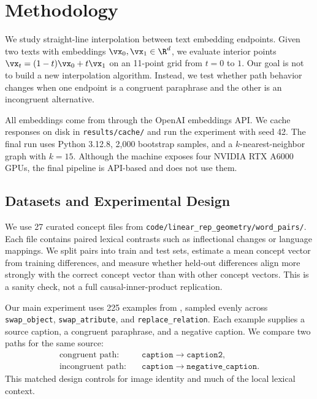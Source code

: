 \section{Methodology}
\label{sec:method}

 We study straight-line interpolation between text embedding endpoints. Given two texts with embeddings $\vx_0, \vx_1 \in \R^d$, we evaluate interior points $\vx_t=(1-t)\vx_0+t\vx_1$ on an 11-point grid from $t=0$ to $1$. Our goal is not to build a new interpolation algorithm. Instead, we test whether path behavior changes when one endpoint is a congruent paraphrase and the other is an incongruent alternative.

 All embeddings come from \embmodel through the OpenAI embeddings API. We cache responses on disk in \texttt{results/cache/} and run the experiment with seed 42. The final run uses Python 3.12.8, 2{,}000 bootstrap samples, and a $k$-nearest-neighbor graph with $k=15$. Although the machine exposes four NVIDIA RTX A6000 GPUs, the final pipeline is API-based and does not use them.

\subsection{Datasets and Experimental Design}

 We use 27 curated concept files from \texttt{code/linear\_rep\_geometry/word\_pairs/}. Each file contains paired lexical contrasts such as inflectional changes or language mappings. We split pairs into train and test sets, estimate a mean concept vector from training differences, and measure whether held-out differences align more strongly with the correct concept vector than with other concept vectors. This is a sanity check, not a full causal-inner-product replication.

 Our main experiment uses 225 examples from \sugarcrepe, sampled evenly across \texttt{swap\_object}, \texttt{swap\_atribute}, and \texttt{replace\_relation}. Each example supplies a source caption, a congruent paraphrase, and a negative caption. We compare two paths for the same source:
\begin{align}
    \text{congruent path}:& \quad \texttt{caption} \rightarrow \texttt{caption2}, \\
    \text{incongruent path}:& \quad \texttt{caption} \rightarrow \texttt{negative\_caption}.
\end{align}
This matched design controls for image identity and much of the local lexical context.


